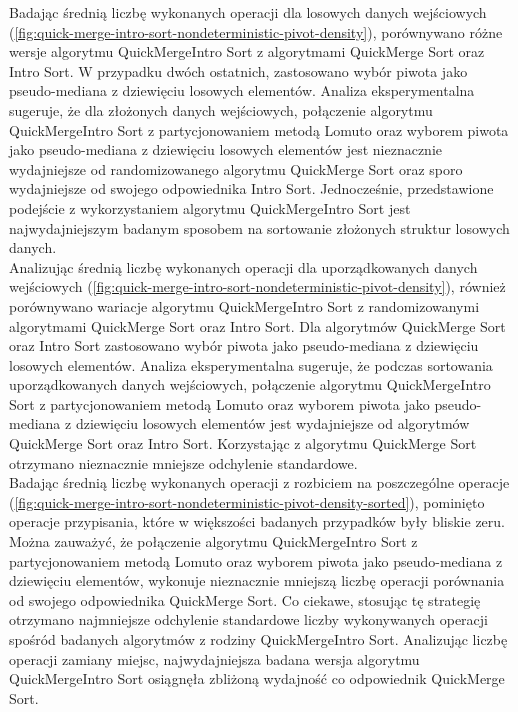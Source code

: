 Badając średnią liczbę wykonanych operacji dla losowych danych wejściowych (\ref{fig:quick-merge-intro-sort-nondeterministic-pivot-density}), porównywano różne wersje algorytmu QuickMergeIntro Sort z algorytmami QuickMerge Sort oraz Intro Sort. W przypadku dwóch ostatnich, zastosowano wybór piwota jako pseudo-mediana z dziewięciu losowych elementów. Analiza eksperymentalna sugeruje, że dla złożonych danych wejściowych, połączenie algorytmu QuickMergeIntro Sort z partycjonowaniem metodą Lomuto oraz wyborem piwota jako pseudo-mediana z dziewięciu losowych elementów jest nieznacznie wydajniejsze od randomizowanego algorytmu QuickMerge Sort oraz sporo wydajniejsze od swojego odpowiednika Intro Sort. Jednocześnie, przedstawione podejście z wykorzystaniem algorytmu QuickMergeIntro Sort jest najwydajniejszym badanym sposobem na sortowanie złożonych struktur losowych danych.\\ 

Analizując średnią liczbę wykonanych operacji dla uporządkowanych danych wejściowych (\ref{fig:quick-merge-intro-sort-nondeterministic-pivot-density}), również porównywano wariacje algorytmu QuickMergeIntro Sort z randomizowanymi algorytmami QuickMerge Sort oraz Intro Sort. Dla algorytmów QuickMerge Sort oraz Intro Sort zastosowano wybór piwota jako pseudo-mediana z dziewięciu losowych elementów. Analiza eksperymentalna sugeruje, że podczas sortowania uporządkowanych danych wejściowych, połączenie algorytmu QuickMergeIntro Sort z partycjonowaniem metodą Lomuto oraz wyborem piwota jako pseudo-mediana z dziewięciu losowych elementów jest wydajniejsze od algorytmów QuickMerge Sort oraz Intro Sort. Korzystając z algorytmu QuickMerge Sort otrzymano nieznacznie mniejsze odchylenie standardowe.\\

Badając średnią liczbę wykonanych operacji z rozbiciem na poszczególne operacje (\ref{fig:quick-merge-intro-sort-nondeterministic-pivot-density-sorted}), pominięto operacje przypisania, które w większości badanych przypadków były bliskie zeru. Można zauważyć, że połączenie algorytmu QuickMergeIntro Sort z partycjonowaniem metodą Lomuto oraz wyborem piwota jako pseudo-mediana z dziewięciu elementów, wykonuje nieznacznie mniejszą liczbę operacji porównania od swojego odpowiednika QuickMerge Sort. Co ciekawe, stosując tę strategię otrzymano najmniejsze odchylenie standardowe liczby wykonywanych operacji spośród badanych algorytmów z rodziny QuickMergeIntro Sort. Analizując liczbę operacji zamiany miejsc, najwydajniejsza badana wersja algorytmu QuickMergeIntro Sort osiągnęła zbliżoną wydajność co odpowiednik QuickMerge Sort.\\

